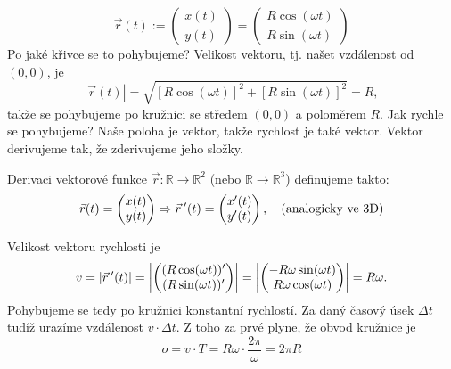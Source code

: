 \begin{equation*}
	\vec{r}(t):= 
\begin{pmatrix}
 x(t) \\ y(t) 
\end{pmatrix} = 
\begin{pmatrix}
  R\cos(\omega t) \\ R\sin(\omega t)
\end{pmatrix}
\end{equation*}
Po jaké křivce se to pohybujeme? Velikost vektoru, tj. našet vzdálenost od $(0,0)$, je
\begin{equation*}
	|\vec{r}(t)|=\sqrt{[R\cos(\omega t)]^{2}+[R\sin(\omega t)]^{2}}=R,
\end{equation*}
takže se pohybujeme po kružnici se středem $(0,0)$ a poloměrem $R$. Jak rychle se pohybujeme? Naše poloha je vektor, takže rychlost je také vektor. Vektor derivujeme tak, že zderivujeme jeho složky.
\begin{definice} Derivaci vektorové funkce $\vec{r}\colon \mathbb{R}\to \mathbb{R}^{2}$ (nebo $\mathbb{R}\to \mathbb{R}^{3}$) definujeme takto:
  \begin{equation*}
	  \vec{r}(t)=\begin{pmatrix}x(t)\\ y(t)\end{pmatrix} \Rightarrow  \vec{r}\hspace{.2em}'(t)=\begin{pmatrix}x'(t)\\ y'(t)\end{pmatrix},\quad (\text{analogicky ve 3D})
  \end{equation*}
\end{definice}
Velikost vektoru rychlosti je
\begin{equation*}
	v = |\vec{r}\hspace{.2em}'(t)|= \left|\begin{pmatrix}(R\cos(\omega t))'\\ (R\sin(\omega t))'\end{pmatrix}\right|=\left|\begin{pmatrix}-R\omega\sin(\omega t)\\ R\omega\cos(\omega t)\end{pmatrix}\right|=R\omega.
\end{equation*}
Pohybujeme se tedy po kružnici konstantní rychlostí. Za daný časový úsek $\Delta t$ tudíž urazíme vzdálenost $v\cdot \Delta t.$ Z toho za prvé plyne, že obvod kružnice je
\begin{equation*}
  o=v\cdot T = R\omega \cdot \frac{2\pi}{\omega} = 2\pi R
\end{equation*}
